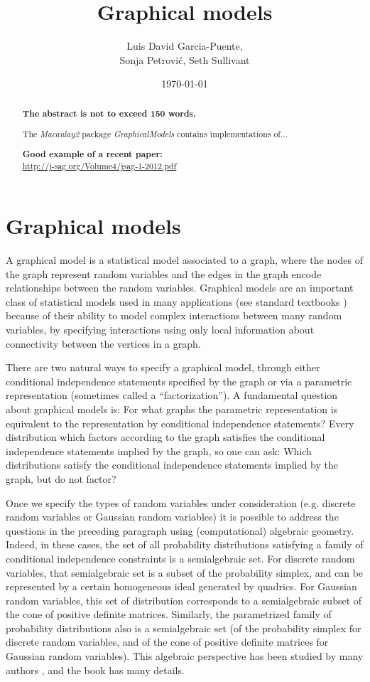 \documentclass{article}
\title{Graphical models}
\author{Luis David Garcia-Puente, \\Sonja Petrovi\'c, Seth Sullivant}
\date{\today}
\theoremstyle{definition}
\begin{document}
\maketitle
\begin{abstract}
{\bf The abstract is not to exceed 150 words.}

The \emph{Macaulay2} package \emph{GraphicalModels} contains implementations of...

{\bf Good example of a recent paper:}\\ \url{http://j-sag.org/Volume4/jsag-1-2012.pdf}
\end{abstract}


\section{Graphical models}
A graphical model is a statistical model associated to a graph,
where the nodes of the graph represent random variables and the
edges in the graph encode relationships between the random variables.
Graphical models are an important class of statistical models used
in many applications (see standard textbooks \cite{Lauritzen, Whitaker})
because of their ability to model complex interactions between
many random variables, by specifying
interactions using only local information about connectivity
between the vertices in a graph.

There are two natural ways to specify a graphical model, through 
either conditional independence statements specified by the graph
or via a parametric representation (sometimes called a ``factorization'').
A fundamental question about graphical models is: For what
graphs the parametric representation is equivalent to the
representation by conditional independence statements?
Every distribution which factors according to the graph
satisfies the conditional independence statements implied by the 
graph, so one can ask:  Which distributions satisfy the conditional
independence statements implied by the graph, but do not factor?

Once we specify the types of random variables under consideration
(e.g. discrete random variables or Gaussian random variables) it
is possible to address the questions in the preceding paragraph
using (computational) algebraic geometry.  Indeed, in these cases,
the set of all probability distributions satisfying a family of 
conditional independence constraints is a semialgebraic set.
For discrete random variables, that semialgebraic set is a subset
of the probability simplex, and can be represented by a certain
homogeneous ideal generated by quadrics.  For Gaussian random variables,
this set of distribution corresponds to a semialgebraic subset
of the cone of positive definite matrices.  Similarly,
the parametrized family of probability distributions also
is a semialgebraic set (of the probability simplex for discrete
random variables, and of the cone of positive definite matrices
for Gaussian random variables).  This algebraic perspective
has been studied by many authors \cite{}, and the book \cite{DSS}
has many details.
\end{document}
